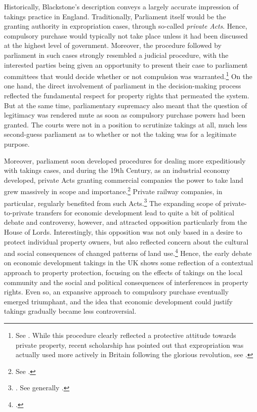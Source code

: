 Historically, Blackstone's description conveys a largely accurate impression of takings practice in England. Traditionally, Parliament itself would be the granting authority in expropriation cases, through so-called {\it private Acts}. Hence, compulsory purchase would typically not take place unless it had been discussed at the highest level of government. Moreover, the procedure followed by parliament in such cases strongly resembled a judicial procedure, with the interested parties being given an opportunity to present their case to parliament committees that would decide whether or not compulsion was warranted.\footnote{See \cite[13-16]{allen00}. While this procedure clearly reflected a protective attitude towards private property, recent scholarship has pointed out that expropriation was actually used more actively in Britain following the glorious revolution, see \cite{hoppit11}.} On the one hand, the direct involvement of parliament in the decision-making process reflected the fundamental respect for property rights that permeated the system. But at the same time, parliamentary supremacy also meant that the question of legitimacy was rendered mute as soon as compulsory purchase powers had been granted. The courts were not in a position to scrutinize takings at all, much less second-guess parliament as to whether or not the taking was for a legitimate purpose.

Moreover, parliament soon developed procedures for dealing more expeditiously with takings cases, and during the 19th Century, as an industrial economy developed, private Acts granting commercial companies the power to take land grew massively in scope and importance.\footnote{See \cite[204]{allen00}.} Private railway companies, in particular, regularly benefited from such Acts.\footnote{\cite[204]{allen00}. See generally \cite{kostal97}.} The expanding scope of private-to-private transfers for economic development lead to quite a bit of political debate and controversy, however, and attracted opposition particularly from the House of Lords. Interestingly, this opposition was not only based in a desire to protect individual property owners, but also reflected concern about the cultural and social consequences of changed patterns of land use.\footcite[204]{allen} Hence, the early debate on economic development takings in the UK shows some reflection of a contextual approach to property protection, focusing on the effects of takings on the local community and the social and political consequences of interferences in property rights. Even so, an expansive approach to compulsory purchase eventually emerged triumphant, and the idea that economic development could justify takings gradually became less controversial.

